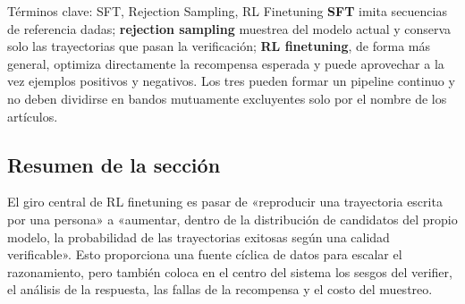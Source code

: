 \begin{knowledgebox}{Términos clave: SFT, Rejection Sampling, RL Finetuning}
\textbf{SFT} imita secuencias de referencia dadas; \textbf{rejection sampling} muestrea del modelo actual y conserva solo las trayectorias que pasan la verificación; \textbf{RL finetuning}, de forma más general, optimiza directamente la recompensa esperada y puede aprovechar a la vez ejemplos positivos y negativos. Los tres pueden formar un pipeline continuo y no deben dividirse en bandos mutuamente excluyentes solo por el nombre de los artículos.
\end{knowledgebox}

\subsection{Resumen de la sección}

El giro central de RL finetuning es pasar de «reproducir una trayectoria escrita por una persona» a «aumentar, dentro de la distribución de candidatos del propio modelo, la probabilidad de las trayectorias exitosas según una calidad verificable». Esto proporciona una fuente cíclica de datos para escalar el razonamiento, pero también coloca en el centro del sistema los sesgos del verifier, el análisis de la respuesta, las fallas de la recompensa y el costo del muestreo.
